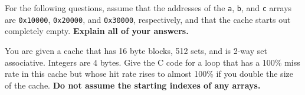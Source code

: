 \documentclass{exam}
\begin{document}
\begin{questions}
    For the following questions, assume that the addresses of the \texttt{a},
    \texttt{b}, and \texttt{c} arrays are \texttt{0x10000}, \texttt{0x20000},
    and \texttt{0x30000}, respectively, and that the cache starts out completely
    empty. \textbf{Explain all of your answers.}


    \newpage
    \question[16] You are given a cache that has 16 byte blocks, 512 sets, and
    is 2-way set associative. Integers are 4 bytes. Give the C code for a loop
    that has a 100\% miss rate in this cache but whose hit rate rises to almost
    100\% if you double the size of the cache. \textbf{Do not assume the
    starting indexes of any arrays.}

\end{questions}
\end{document}
